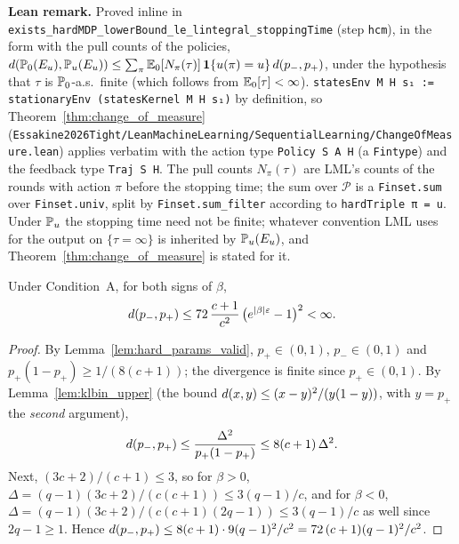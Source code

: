 \textbf{Lean remark.} Proved inline in \texttt{exists\_hardMDP\_lowerBound\_le\_lintegral\_stoppingTime}
(step \texttt{hcm}), in the form with the pull counts of the policies,
$d(\mathbb{P}_0(E_u), \mathbb{P}_u(E_u)) \le \sum_\pi \mathbb{E}_0[N_\pi(\tau)]\,\mathbf{1}\{u(\pi) = u\}\,d(p_-, p_+)$,
under the hypothesis that $\tau$ is $\mathbb{P}_0$-a.s.\ finite (which follows from $\mathbb{E}_0[\tau] < \infty$).
\texttt{statesEnv M H s₁ := stationaryEnv (statesKernel M H s₁)} by
definition, so Theorem~\ref{thm:change_of_measure}
(\texttt{Essakine2026Tight/LeanMachineLearning/SequentialLearning/ChangeOfMeasure.lean})
applies verbatim with the action type \texttt{Policy S A H} (a \texttt{Fintype}) and the
feedback type \texttt{Traj S H}. The pull counts $N_\pi(\tau)$ are LML's counts of the rounds
with action $\pi$ before the stopping time; the sum over $\mathcal P$ is a \texttt{Finset.sum}
over \texttt{Finset.univ}, split by \texttt{Finset.sum\_filter} according to
\texttt{hardTriple π = u}. Under $\mathbb{P}_u$ the stopping time need not be finite; whatever
convention LML uses for the output on $\{\tau = \infty\}$ is inherited by $\mathbb{P}_u(E_u)$, and
Theorem~\ref{thm:change_of_measure} is stated for it.

\begin{lemma}\label{lem:hard_kl_params}
\leanok
Under Condition~A, for both signs of $\beta$,
\[
  d(p_-, p_+) \le 72\,\frac{c+1}{c^2}\,\big(e^{|\beta|\varepsilon} - 1\big)^2 < \infty .
\]
\end{lemma}

\begin{proof}
\leanok
{}
By Lemma~\ref{lem:hard_params_valid}, $p_+ \in (0,1)$, $p_- \in (0,1)$ and
$p_+(1-p_+) \ge 1/(8(c+1))$; the divergence is finite since $p_+ \in (0,1)$. By Lemma~\ref{lem:klbin_upper}
(the bound $d(x,y) \le (x-y)^2/(y(1-y))$, with $y = p_+$ the \emph{second} argument),
\[
  d(p_-, p_+) \le \frac{\Delta^2}{p_+(1-p_+)} \le 8(c+1)\,\Delta^2 .
\]
Next, $(3c+2)/(c+1) \le 3$, so for $\beta > 0$, $\Delta = (q-1)(3c+2)/(c(c+1)) \le 3(q-1)/c$, and for
$\beta < 0$, $\Delta = (q-1)(3c+2)/(c(c+1)(2q-1)) \le 3(q-1)/c$ as well since $2q - 1 \ge 1$. Hence
$d(p_-,p_+) \le 8(c+1)\cdot 9(q-1)^2/c^2 = 72\,(c+1)(q-1)^2/c^2$.
\end{proof}

